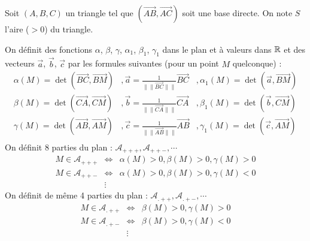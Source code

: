Soit $(A,B,C)$ un triangle tel que $(\overrightarrow{AB},\overrightarrow{AC})$ soit une base directe. On note $S$ l'aire ($>0$) du triangle.

On définit des fonctions $\alpha$, $\beta$, $\gamma$, $\alpha_1$, $\beta_1$, $\gamma_1$ dans le plan et à valeurs dans $\mathbb{R}$ et des vecteurs $\overrightarrow{a}$, $\overrightarrow{b}$, $\overrightarrow{c}$ par les formules suivantes (pour un point $M$ quelconque) :
\begin{eqnarray*}
\alpha(M)=\det(\overrightarrow{BC},\overrightarrow{BM}) &, \overrightarrow{a}=\frac{1}{\|\|\overrightarrow{BC}\|\|}\overrightarrow{BC} &, \alpha_1(M)=\det(\overrightarrow{a},\overrightarrow{BM})\\
\beta(M)=\det(\overrightarrow{CA},\overrightarrow{CM}) &, \overrightarrow{b}=\frac{1}{\|\|\overrightarrow{CA}\|\|}\overrightarrow{CA} &, \beta_1(M)=\det(\overrightarrow{b},\overrightarrow{CM})\\
\gamma(M)=\det(\overrightarrow{AB},\overrightarrow{AM}) &, \overrightarrow{c}=\frac{1}{\|\|\overrightarrow{AB}\|\|}\overrightarrow{AB} &, \gamma_1(M)=\det(\overrightarrow{c},\overrightarrow{AM})\\
\end{eqnarray*}
On définit 8 parties du plan : $\mathcal{A}_{+++}, \mathcal{A}_{++-}, \cdots $ 
\begin{eqnarray*}
M\in \mathcal{A}_{+++} & \Leftrightarrow & \alpha(M)>0, \beta(M)>0, \gamma(M)>0 \\
M\in \mathcal{A}_{++-} & \Leftrightarrow & \alpha(M)>0, \beta(M)>0, \gamma(M)<0 \\
 &\vdots& 
\end{eqnarray*}
On définit de même 4 parties du plan : $\mathcal{A}_{.++}, \mathcal{A}_{.+-}, \cdots $ 
\begin{eqnarray*}
M\in \mathcal{A}_{.++} & \Leftrightarrow & \beta(M)>0, \gamma(M)>0 \\
M\in \mathcal{A}_{.+-} & \Leftrightarrow & \beta(M)>0, \gamma(M)<0 \\
 &\vdots& 
\end{eqnarray*}

